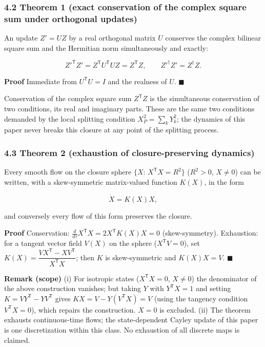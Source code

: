 \documentclass[
  a4paper,
]{article}
\begin{document}
\subsubsection{4.2 Theorem 1 (exact conservation of the complex square
sum under orthogonal
updates)}\label{theorem-1-exact-conservation-of-the-complex-square-sum-under-orthogonal-updates}

An update \(Z'=UZ\) by a real orthogonal matrix \(U\) conserves the
complex bilinear square sum and the Hermitian norm simultaneously and
exactly:

\[
Z'^{\mathsf T}Z'=Z^{\mathsf T}U^{\mathsf T}UZ=Z^{\mathsf T}Z,
\qquad
Z'^{\dagger}Z'=Z^{\dagger}Z.
\]

\textbf{Proof} Immediate from \(U^{\mathsf T}U=I\) and the realness of
\(U\). \(\blacksquare\)

Conservation of the complex square sum \(Z^{\mathsf T}Z\) is the
simultaneous conservation of two conditions, its real and imaginary
parts. These are the same two conditions demanded by the local splitting
condition \(X_P^2=\sum_kY_k^2\); the dynamics of this paper never breaks
this closure at any point of the splitting process.

\subsubsection{4.3 Theorem 2 (exhaustion of closure-preserving
dynamics)}\label{theorem-2-exhaustion-of-closure-preserving-dynamics}

Every smooth flow on the closure sphere \(\{X:\,X^{\mathsf T}X=R^2\}\)
(\(R^2>0\), \(X\ne0\)) can be written, with a skew-symmetric
matrix-valued function \(K(X)\), in the form

\[
\dot X=K(X)X,
\]

and conversely every flow of this form preserves the closure.

\textbf{Proof} Conservation:
\(\frac{d}{d\tau}X^{\mathsf T}X=2X^{\mathsf T}K(X)X=0\) (skew-symmetry).
Exhaustion: for a tangent vector field \(V(X)\) on the sphere
(\(X^{\mathsf T}V=0\)), set
\(K(X)=\dfrac{VX^{\mathsf T}-XV^{\mathsf T}}{X^{\mathsf T}X}\); then
\(K\) is skew-symmetric and \(K(X)X=V\). \(\blacksquare\)

\textbf{Remark (scope)} (i) For isotropic states (\(X^{\mathsf T}X=0\),
\(X\ne0\)) the denominator of the above construction vanishes; but
taking \(Y\) with \(Y^{\mathsf T}X=1\) and setting
\(K=VY^{\mathsf T}-YV^{\mathsf T}\) gives \(KX=V-Y(V^{\mathsf T}X)=V\)
(using the tangency condition \(V^{\mathsf T}X=0\)), which repairs the
construction. \(X=0\) is excluded. (ii) The theorem exhausts
continuous-time flows; the state-dependent Cayley update of this paper
is one discretization within this class. No exhaustion of all discrete
maps is claimed.
\end{document}
